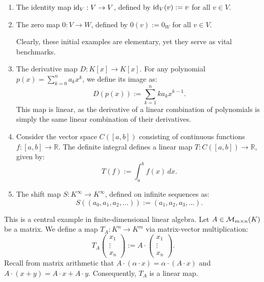 \begin{example}
\label{ex:fundamental_linear_maps}
\begin{enumerate}
    \item The identity map $\operatorname{id}_V: V \to V$, defined by $\operatorname{id}_V(v) := v$ for all $v \in V$.
    \item The zero map $0: V \to W$, defined by $0(v) := 0_W$ for all $v \in V$. 
    
    Clearly, these initial examples are elementary, yet they serve as vital benchmarks.
    
    \item The derivative map $D: K[x] \to K[x]$. For any polynomial $p(x) = \sum_{k=0}^n a_k x^k$, we define its image as:
    \[
    D(p(x)) := \sum_{k=1}^n k a_k x^{k-1}.
    \]
    This map is linear, as the derivative of a linear combination of polynomials is simply the same linear combination of their derivatives.
    
    \item Consider the vector space $C([a, b])$ consisting of continuous functions $f: [a, b] \to \mathbb{R}$. The definite integral defines a linear map $T: C([a, b]) \to \mathbb{R}$, given by:
    \[
    T(f) := \int_a^b f(x) \, dx.
    \]
    
    \item The shift map $S: K^\infty \to K^\infty$, defined on infinite sequences as:
    \[
    S((a_0, a_1, a_2, \dots)) := (a_1, a_2, a_3, \dots).
    \]
\end{enumerate}
\end{example}

\begin{example}
\label{ex:matrix_transformation}
This is a central example in finite-dimensional linear algebra. Let $A \in \mathcal{M}_{m \times n}(K)$ be a matrix. We define a map $T_A: K^n \to K^m$ via matrix-vector multiplication:
\[
T_A \left(\begin{smallmatrix} x_1 \\ \vdots \\ x_n \end{smallmatrix}\right) := A \cdot \left(\begin{smallmatrix} x_1 \\ \vdots \\ x_n \end{smallmatrix}\right).
\]
Recall from matrix arithmetic that $A \cdot (\alpha \cdot x) = \alpha \cdot (A \cdot x)$ and $A \cdot (x + y) = A \cdot x + A \cdot y$. Consequently, $T_A$ is a linear map.
\end{example}

